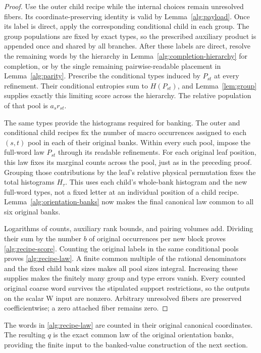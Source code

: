 \begin{proof}
Use the outer child recipe while the internal choices remain unresolved
fibers.  Its coordinate-preserving identity is valid by
Lemma~\ref{alg:payload}.  Once its label is direct, apply the corresponding
conditional child in each group.  The group populations are fixed by exact
types, so the prescribed auxiliary product is appended once and shared by
all branches.  After these labels are direct, resolve the remaining words
by the hierarchy in Lemma~\ref{alg:completion-hierarchy} for completion,
or by the single remaining pairwise-readable placement in
Lemma~\ref{alg:parity}.  Prescribe the conditional types induced by
\(P_{st}\) at every refinement.  Their conditional entropies sum to
\(H(P_{st})\), and Lemma~\ref{lem:group} supplies exactly this limiting
score across the hierarchy.  The relative population of that pool is
\(a_sr_{st}\).

The same types provide the histograms required for banking.  The outer and
conditional child recipes fix the number of macro occurrences assigned to
each \((s,t)\) pool in each of their original banks.  Within every such
pool, impose the full-word law \(P_{st}\) through its readable refinements.
For each original leaf position, this law fixes its marginal counts across
the pool, just as in the preceding proof.  Grouping those contributions by
the leaf's relative physical permutation fixes the total histograms
\(H_\tau\).  This uses each child's whole-bank histogram and the new
full-word types, not a fixed letter at an individual position of a child
recipe.  Lemma~\ref{alg:orientation-banks} now makes the final canonical
law common to all six original banks.

Logarithms of counts, auxiliary rank bounds, and pairing volumes add.
Dividing their sum by the number \(b\) of original occurrences per new
block proves \eqref{alg:recipe-score}.  Counting the original labels in
the same conditional pools proves \eqref{alg:recipe-law}.  A finite common
multiple of the rational denominators and the fixed child bank sizes
makes all pool sizes integral.  Increasing these supplies makes the finitely
many group and type errors vanish.  Every counted original coarse word
survives the stipulated support restrictions, so the outputs on the scalar
W input are nonzero.  Arbitrary unresolved fibers are preserved
coefficientwise; a zero attached fiber remains zero.
\end{proof}

The words in \eqref{alg:recipe-law} are counted in their original canonical
coordinates.  The resulting \(q\) is the exact common law of the original
orientation banks, providing the finite input to the banked-value
construction of the next section.
